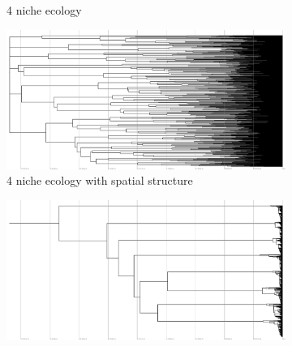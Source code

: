 \begin{figure}
\begin{subfigure}[b]{0.5\columnwidth}
    \caption{%
      4 niche ecology}
  \end{subfigure}
  \hfill
  \begin{subfigure}[b]{0.5\columnwidth}
    \includegraphics[height=0.12\textheight,width=\textwidth]{img/perfect-tree-phylogenies-log/epoch=7+resolution=3+treatment=22.pdf}
    \caption{%
      4 niche ecology with spatial structure}
  \end{subfigure}
  \hfill
  \begin{subfigure}[b]{0.5\columnwidth}
    \includegraphics[height=0.12\textheight,width=\textwidth]{img/perfect-tree-phylogenies-log/epoch=7+resolution=3+treatment=20.pdf}

\end{subfigure}
\end{figure}

